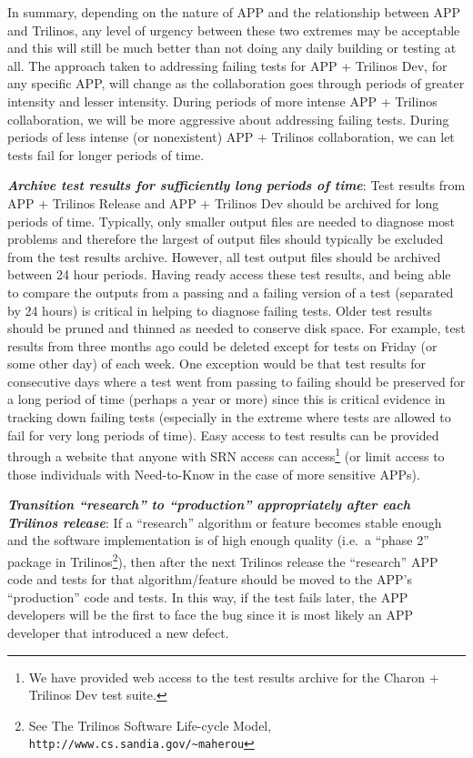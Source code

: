 \documentclass[pdf,ps2pdf,11pt]{SANDreport}
\begin{document}
In summary, depending on the nature of APP and the relationship between APP
and Trilinos, any level of urgency between these two extremes may be
acceptable and this will still be much better than not doing any daily
building or testing at all.  The approach taken to addressing failing tests
for APP + Trilinos Dev, for any specific APP, will change as the collaboration
goes through periods of greater intensity and lesser intensity.  During
periods of more intense APP + Trilinos collaboration, we will be more
aggressive about addressing failing tests.  During periods of less intense (or
nonexistent) APP + Trilinos collaboration, we can let tests fail for longer
periods of time.

{}\textit{\textbf{Archive test results for sufficiently long periods of
time}}: Test results from APP + Trilinos Release and APP + Trilinos Dev should
be archived for long periods of time.  Typically, only smaller output files
are needed to diagnose most problems and therefore the largest of output files
should typically be excluded from the test results archive.  However, all test
output files should be archived between 24 hour periods.  Having ready access
these test results, and being able to compare the outputs from a passing and a
failing version of a test (separated by 24 hours) is critical in helping to
diagnose failing tests.  Older test results should be pruned and thinned as
needed to conserve disk space.  For example, test results from three months
ago could be deleted except for tests on Friday (or some other day) of each
week.  One exception would be that test results for consecutive days where a
test went from passing to failing should be preserved for a long period of
time (perhaps a year or more) since this is critical evidence in tracking down
failing tests (especially in the extreme where tests are allowed to fail for
very long periods of time).  Easy access to test results can be provided
through a website that anyone with SRN access can access\footnote{We have
provided web access to the test results archive for the Charon + Trilinos Dev
test suite.} (or limit access to those individuals with Need-to-Know in the
case of more sensitive APPs).

{}\textit{\textbf{Transition ``research'' to ``production'' appropriately
after each Trilinos release}}: If a ``research'' algorithm or feature becomes
stable enough and the software implementation is of high enough quality (i.e.\
a ``phase 2'' package in Trilinos\footnote{See The Trilinos Software Life-cycle
Model, {}\texttt{http://www.cs.sandia.gov/\~{}maherou}}), then after the next
Trilinos release the ``research'' APP code and tests for that
algorithm/feature should be moved to the APP's ``production'' code and tests.
In this way, if the test fails later, the APP developers will be the first to
face the bug since it is most likely an APP developer that introduced a new
defect.
\end{document}
